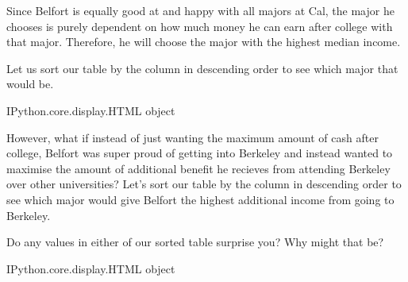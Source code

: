 \documentclass[letterpaper,10pt,english]{jupyterBook}
\begin{document}
\sphinxAtStartPar
Since Belfort is equally good at and happy with all majors at Cal, the major he chooses is purely dependent on how much money he can earn after college with that major.
Therefore, he will choose the major with the highest median income.

\sphinxAtStartPar
Let us sort our table by the  column in descending order to see which major that would be.

\begin{sphinxVerbatim}[commandchars=\\\{\}]
\end{sphinxVerbatim}

\begin{sphinxVerbatim}[commandchars=\\\{\}]
\PYGZlt{}IPython.core.display.HTML object\PYGZgt{}
\end{sphinxVerbatim}

\sphinxAtStartPar
However, what if instead of just wanting the maximum amount of cash after college, Belfort was super proud of getting into Berkeley and instead wanted to maximise the amount of additional benefit he recieves from attending Berkeley over other universities?
Let’s sort our table by the  column in descending order to see which major would give Belfort the highest additional income from going to Berkeley.

\sphinxAtStartPar
Do any values in either of our sorted table surprise you? Why might that be?

\begin{sphinxVerbatim}[commandchars=\\\{\}]
\end{sphinxVerbatim}

\begin{sphinxVerbatim}[commandchars=\\\{\}]
\PYGZlt{}IPython.core.display.HTML object\PYGZgt{}
\end{sphinxVerbatim}
\end{document}
